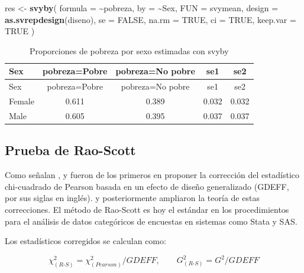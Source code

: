 \documentclass[
  spanish,
  12pt,
]{book}
\newenvironment{Shaded}{\begin{snugshade}}{\end{snugshade}}
\newcommand{\AttributeTok}[1]{\textcolor[rgb]{0.13,0.29,0.53}{#1}}
\newcommand{\ConstantTok}[1]{\textcolor[rgb]{0.56,0.35,0.01}{#1}}
\newcommand{\FunctionTok}[1]{\textcolor[rgb]{0.13,0.29,0.53}{\textbf{#1}}}
\newcommand{\NormalTok}[1]{#1}
\newcommand{\OtherTok}[1]{\textcolor[rgb]{0.56,0.35,0.01}{#1}}
\newcommand{\SpecialCharTok}[1]{\textcolor[rgb]{0.81,0.36,0.00}{\textbf{#1}}}
\begin{document}
\begin{Shaded}
\begin{Highlighting}[]
\NormalTok{res }\OtherTok{\textless{}{-}} \FunctionTok{svyby}\NormalTok{(}
         \AttributeTok{formula =} \SpecialCharTok{\textasciitilde{}}\NormalTok{pobreza,}
         \AttributeTok{by      =} \SpecialCharTok{\textasciitilde{}}\NormalTok{Sex,}
         \AttributeTok{FUN     =}\NormalTok{ svymean,}
         \AttributeTok{design  =} \FunctionTok{as.svrepdesign}\NormalTok{(diseno),}
         \AttributeTok{se =} \ConstantTok{FALSE}\NormalTok{, }\AttributeTok{na.rm =} \ConstantTok{TRUE}\NormalTok{, }\AttributeTok{ci =} \ConstantTok{TRUE}\NormalTok{, }\AttributeTok{keep.var =} \ConstantTok{TRUE}
\NormalTok{       )}
\end{Highlighting}
\end{Shaded}

\begin{longtable}[]{@{}lcccc@{}}
\caption{\label{tab:tab-proporciones-svyby}Proporciones de pobreza por sexo estimadas con svyby}\tabularnewline
\toprule\noalign{}
Sex & pobreza=Pobre & pobreza=No pobre & se1 & se2 \\
\midrule\noalign{}
\endfirsthead
\toprule\noalign{}
Sex & pobreza=Pobre & pobreza=No pobre & se1 & se2 \\
\midrule\noalign{}
\endhead
\bottomrule\noalign{}
\endlastfoot
Female & 0.611 & 0.389 & 0.032 & 0.032 \\
Male & 0.605 & 0.395 & 0.037 & 0.037 \\
\end{longtable}

\subsection{Prueba de Rao-Scott}\label{sec-rao-scott}

Como señalan \citet{heeringa2017applied}, \citet{fay1979contingency} y \citet{fellegi1980approximate} fueron de los primeros en proponer la corrección del estadístico chi-cuadrado de Pearson basada en un efecto de diseño generalizado (GDEFF, por sus siglas en inglés). \citet{rao1984chisquare} y posteriormente \citet{thomas1987chisquare} ampliaron la teoría de estas correcciones. El método de Rao-Scott es hoy el estándar en los procedimientos para el análisis de datos categóricos de encuestas en sistemas como Stata y SAS.

Los estadísticos corregidos se calculan como:

\[
\chi^2_{(R\text{-}S)} = \chi^2_{(Pearson)} \big/ GDEFF, \qquad G^2_{(R\text{-}S)} = G^2 \big/ GDEFF
\]
\end{document}
